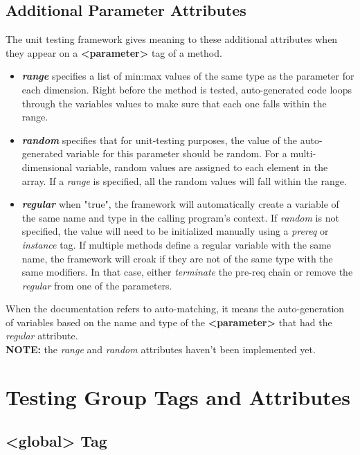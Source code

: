 \documentclass[paper=a4, fontsize=11pt]{scrartcl} %
\numberwithin{equation}{section} %
\numberwithin{figure}{section} %
\numberwithin{table}{section} %
\begin{document}
\subsection{Additional Parameter Attributes}

The unit testing framework gives meaning to these additional attributes when they appear on
a \textbf{<parameter>} tag of a method.

\begin{itemize}
\item \textbf{\textit{range}} specifies a list of min:max values of the same type as the
parameter for each dimension. Right before the method is tested, auto-generated code loops through
the variables values to make sure that each one falls within the range.
\item \textbf{\textit{random}} specifies that for unit-testing purposes, the value of
the auto-generated variable for this parameter should be random. For a multi-dimensional
variable, random values are assigned to each element in the array. If a \textit{range} is
specified, all the random values will fall within the range.
\item \textbf{\textit{regular}} when "true", the framework will automatically create a
variable of the same name and type in the calling program's context. If \textit{random} is not
specified, the value will need to be initialized manually using a \textit{prereq} or \textit{instance}
tag. If multiple methods define a regular variable with the same name, the framework will
croak if they are not of the same type with the same modifiers. In that case, either
\textit{terminate} the pre-req chain or remove the \textit{regular} from one of the parameters.
\end{itemize}

When the documentation refers to auto-matching, it means the auto-generation of variables
based on the name and type of the \textbf{<parameter>} that had the \textit{regular} attribute.\\

\textbf{NOTE:} the \textit{range} and \textit{random} attributes haven't been implemented yet.

\section{Testing Group Tags and Attributes}

\subsection{<global> Tag}
\end{document}

